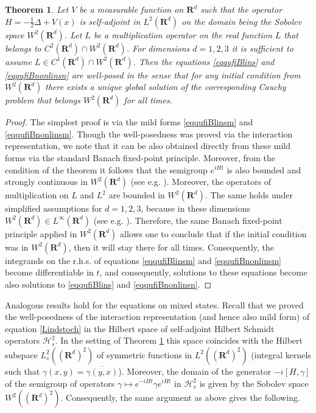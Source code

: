\documentclass[12pt]{article}
\def\HC{\mathcal{H}}
\def\R{\mathbf{R}}
\def\ga{\gamma}
\newtheorem{theorem}{Theorem}[section]
\newcommand{\De}{\Delta}
\begin{document}
\begin{theorem}
\label{thclassichamfilt}
Let $V$ be a measurable function on $\R^d$ such that the operator $H=-\frac12 \De +V(x)$ is self-adjoint
in $L^2(\R^d)$ on the domain being the Sobolev space $W^2(\R^d)$. Let $L$ be a multiplication operator
on the real function $L$ that belongs to $C^2(\R^d)\cap W^2(\R^d)$. For dimensions $d=1,2,3$ it
is sufficient to assume $L\in C^1(\R^d)\cap W^2(\R^d)$. Then the equations
\eqref{eqqufiBlins} and \eqref{eqqufiBnonlinsn} are well-posed in the sense that for any initial condition
from $W^2(\R^d)$ there exists a unique global solution of the corresponding Cauchy problem that belongs
$W^2(\R^d)$ for all times.
\end{theorem}

\begin{proof}
The simplest proof is via the mild forms
\eqref{eqqufiBlinsm} and \eqref{eqqufiBnonlinsm}. Though the well-posedness
was proved via the interaction representation, we note that it can be also obtained directly from
these mild forms via the standard Banach fixed-point principle. Moreover,
from the condition of the theorem it follows that the semigroup $e^{iHt}$
is also bounded and strongly continuous in $W^2(\R^d)$ (see e.g. \cite{Yajima}).
Moreover, the operators of multiplication on $L$ and $L^2$ are bounded in $W^2(\R^d)$.
The same holds under simplified assumptions for $d=1,2,3$, because in these dimensions
$W^2(\R^d)\in L^{\infty}(\R^d)$ (see e.g. \cite{ReedSimon}).  Therefore,
the same Banach fixed-point principle applied in $W^2(\R^d)$ allows one
to conclude that if the initial condition was in $W^2(\R^d)$, then it will stay there for all times.
Consequently, the integrands on the r.h.s. of equations \eqref{eqqufiBlinsm} and \eqref{eqqufiBnonlinsm}
become differentiable in $t$, and consequently, solutions to these equations become also solutions to
\eqref{eqqufiBlins} and \eqref{eqqufiBnonlinsn}.
\end{proof}

Analogous results hold for the equations on mixed states. Recall that we proved
the well-posedness of the interaction representation (and hence also mild form)
of equation  \eqref{Lindstoch} in the Hilbert space of self-adjoint
Hilbert Schmidt operators $\HC^2_s$. In the setting of Theorem \ref{thclassichamfilt} this space
coincides with the Hilbert subspace  $L^2_s((\R^d)^2)$ of symmetric functions in
$L^2((\R^d)^2)$ (integral kernels such that $\ga(x,y)=\overline{\ga(y,x)}$).
Moreover, the domain of the generator $-i[H, \ga]$ of the semigroup of operators
$\ga \mapsto e^{-iHt}\ga e^{iH t}$ in $\HC^2_s$  is given by the Sobolev space $W^2((\R^d)^2)$.
Consequently, the same argument as above gives the following.
\end{document}
